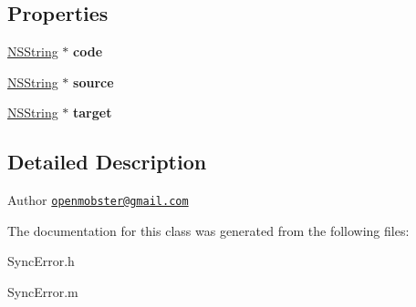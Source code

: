 \subsection*{\-Properties}
\begin{DoxyCompactItemize}
\item 
\hypertarget{interface_sync_error_a262f3e0883b59db9797fa0b4ee079716}{
\hyperlink{class_n_s_string}{\-N\-S\-String} $\ast$ {\bfseries code}}
\label{interface_sync_error_a262f3e0883b59db9797fa0b4ee079716}

\item 
\hypertarget{interface_sync_error_a2afbdf877722b936ba239d7d9eef7631}{
\hyperlink{class_n_s_string}{\-N\-S\-String} $\ast$ {\bfseries source}}
\label{interface_sync_error_a2afbdf877722b936ba239d7d9eef7631}

\item 
\hypertarget{interface_sync_error_a213373ca10f69e4e7def8f9cfab3c542}{
\hyperlink{class_n_s_string}{\-N\-S\-String} $\ast$ {\bfseries target}}
\label{interface_sync_error_a213373ca10f69e4e7def8f9cfab3c542}

\end{DoxyCompactItemize}


\subsection{\-Detailed \-Description}
\begin{DoxyAuthor}{\-Author}
\href{mailto:openmobster@gmail.com}{\tt openmobster@gmail.\-com} 
\end{DoxyAuthor}


\-The documentation for this class was generated from the following files\-:\begin{DoxyCompactItemize}
\item 
\-Sync\-Error.\-h\item 
\-Sync\-Error.\-m\end{DoxyCompactItemize}
